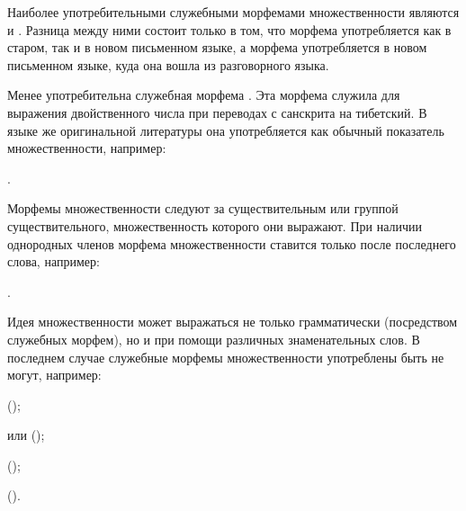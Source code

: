 Наиболее употребительными служебными морфемами множественности являются  и . Разница между ними состоит только в том, что морфема  употребляется как в старом, так и в новом письменном языке, а морфема  употребляется в новом письменном языке, куда она вошла из разговорного языка.

Менее употребительна служебная морфема .
Эта морфема служила для выражения двойственного числа при переводах с санскрита на тибетский. В языке же оригинальной литературы она употребляется как обычный показатель множественности, например:
\begin{prfsample}
    \item {}.
\end{prfsample}

Морфемы множественности следуют за существительным или группой существительного, множественность которого они выражают. При наличии однородных членов морфема множественности ставится только после последнего слова, например:
\begin{prfsample}
    \item {}.
\end{prfsample}

Идея множественности может выражаться не только грамматически (посредством служебных морфем), но и при помощи различных знаменательных слов. В последнем случае служебные морфемы множественности употреблены быть не могут, например:
\begin{prfsample}
    \item {} ();
    \item {} или  ();
    \item {} ();
    \item {} ().
\end{prfsample}

